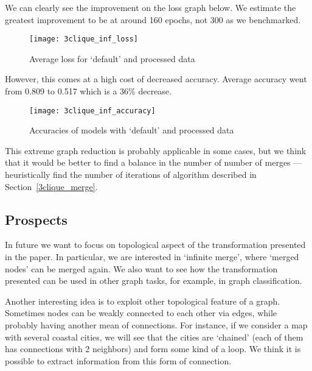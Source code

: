 We can clearly see the improvement on the loss graph below.
We estimate the greatest improvement to be at around 160 epochs, not 300 as we benchmarked.

\begin{figure}[h]
	\centering
	\texttt{[image: 3clique\_inf\_loss]}
	\caption{Average loss for `default' and processed data}
\end{figure}

However, this comes at a high cost of decreased accuracy.
Average accuracy went from 0.809 to 0.517 which is a 36\% decrease.

\begin{figure}[h]
	\centering
	\texttt{[image: 3clique\_inf\_accuracy]}
	\caption{Accuracies of models with `default' and processed data}
\end{figure}

This extreme graph reduction is probably applicable in some cases, but we think that it would be better to find a balance in the number of number of merges --- heuristically find the number of iterations of algorithm described in Section~\ref{3clique_merge}.

\subsection{Prospects}

In future we want to focus on topological aspect of the transformation presented in the paper.
In particular, we are interested in `infinite merge', where `merged nodes' can be merged again.
We also want to see how the transformation presented can be used in other graph tasks, for example, in graph classification.

Another interesting idea is to exploit other topological feature of a graph.
Sometimes nodes can be weakly connected to each other via edges, while probably having another mean of connections.
For instance, if we consider a map with several coastal cities, we will see that the cities are `chained' (each of them has connections with 2 neighbors) and form some kind of a loop.
We think it is possible to extract information from this form of connection.

